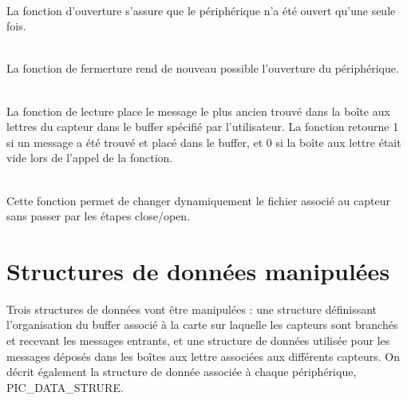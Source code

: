 \begin{m_desc}
 \item [PIC\_Open] \hfill\\
La fonction d'ouverture s'assure que le périphérique n'a été ouvert qu'une seule fois. 

 \item [PIC\_Close] \hfill\\
La fonction de fermerture rend de nouveau possible l'ouverture du périphérique.

 \item [PIC\_Read] \hfill\\
La fonction de lecture place le message le plus ancien trouvé dans la boîte aux lettres du capteur dans le buffer spécifié par l'utilisateur. 
La fonction retourne 1 si un message a été trouvé et placé dans le buffer, et 0 si la boîte aux lettre était vide lors de l'appel de la fonction.

 \item [PIC\_IoCtl] \hfill\\
Cette fonction permet de changer dynamiquement le fichier associé au capteur sans passer par les étapes close/open.

\end{m_desc}

\section{Structures de données manipulées}

Trois structures de données vont être manipulées : une structure définissant l'organisation du buffer associé à la carte sur laquelle les capteurs sont branchés et recevant les messages entrants, et une structure de données utilisée pour les messages déposés dans les boîtes aux lettre associées aux différents capteurs. On décrit également la structure de donnée associée à chaque périphérique, PIC\_DATA\_STRURE.

